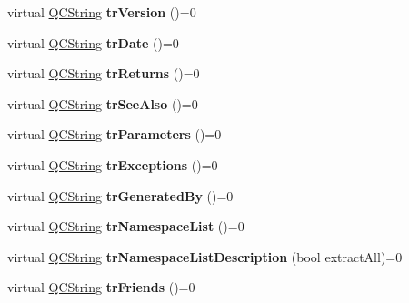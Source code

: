 \begin{DoxyCompactItemize}
\mbox{\label{class_translator_a5969dae9422940f4675aa18304b16087}} 
virtual \mbox{\hyperlink{class_q_c_string}{Q\+C\+String}} {\bfseries tr\+Version} ()=0
\item 
\mbox{\label{class_translator_aa1e4638e8942601483cf2ba078b86f05}} 
virtual \mbox{\hyperlink{class_q_c_string}{Q\+C\+String}} {\bfseries tr\+Date} ()=0
\item 
\mbox{\label{class_translator_a6085a6938ea5edb5b1a61874983260e5}} 
virtual \mbox{\hyperlink{class_q_c_string}{Q\+C\+String}} {\bfseries tr\+Returns} ()=0
\item 
\mbox{\label{class_translator_ad1f5dba74deba99cafcf97a3df60164e}} 
virtual \mbox{\hyperlink{class_q_c_string}{Q\+C\+String}} {\bfseries tr\+See\+Also} ()=0
\item 
\mbox{\label{class_translator_aab8ec7804a21da51d6e6447d5dd19aea}} 
virtual \mbox{\hyperlink{class_q_c_string}{Q\+C\+String}} {\bfseries tr\+Parameters} ()=0
\item 
\mbox{\label{class_translator_a638f0cdaaad952acdd6830c76ff740fc}} 
virtual \mbox{\hyperlink{class_q_c_string}{Q\+C\+String}} {\bfseries tr\+Exceptions} ()=0
\item 
\mbox{\label{class_translator_a8ba96cf4ebea87a6706e8544661cb0c9}} 
virtual \mbox{\hyperlink{class_q_c_string}{Q\+C\+String}} {\bfseries tr\+Generated\+By} ()=0
\item 
\mbox{\label{class_translator_aa204b3cebbb1807093fb76afca1e41e1}} 
virtual \mbox{\hyperlink{class_q_c_string}{Q\+C\+String}} {\bfseries tr\+Namespace\+List} ()=0
\item 
\mbox{\label{class_translator_ab47254ac74585b9a1f5aa51a689d2058}} 
virtual \mbox{\hyperlink{class_q_c_string}{Q\+C\+String}} {\bfseries tr\+Namespace\+List\+Description} (bool extract\+All)=0
\item 
\mbox{\label{class_translator_ab046901f13c045c05588f7e45a3f806d}} 
virtual \mbox{\hyperlink{class_q_c_string}{Q\+C\+String}} {\bfseries tr\+Friends} ()=0

\end{DoxyCompactItemize}
